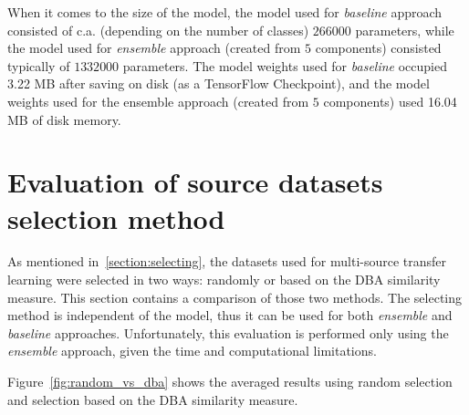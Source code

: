 \documentclass[a4paper,11pt,twoside]{report}
\theoremstyle{definition}
\begin{document}
When it comes to the size of the model, the model used for \textit{baseline} approach consisted of c.a. (depending on the number of classes) $266 000$ parameters, while the model used for \textit{ensemble} approach (created from $5$ components) consisted typically of $1 332 000$ parameters. The model weights used for \textit{baseline} occupied 3.22 MB after saving on disk (as a TensorFlow Checkpoint), and the model weights used for the ensemble approach (created from $5$ components) used 16.04 MB of disk memory.

\section{Evaluation of source datasets selection method}
As mentioned in~\ref{section:selecting}, the datasets used for multi-source transfer learning were selected in two ways: randomly or based on the DBA similarity measure. This section contains a comparison of those two methods. The selecting method is independent of the model, thus it can be used for both \textit{ensemble} and \textit{baseline} approaches. Unfortunately, this evaluation is performed only using the \textit{ensemble} approach, given the time and computational limitations.

Figure~\ref{fig:random_vs_dba} shows the averaged results using random selection and selection based on the DBA similarity measure.
\end{document}
